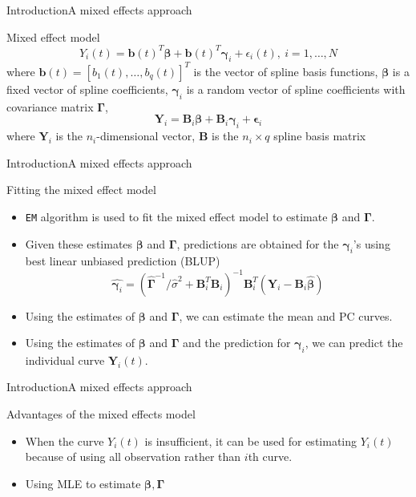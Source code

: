 \documentclass{beamer}
\def \bY {\mathbf{Y}}
\def \bB {\mathbf{B}}
\def \bbeta {\boldsymbol{\beta}}
\def \bepsilon {\boldsymbol{\epsilon}}
\def \bgamma {\boldsymbol{\gamma}}
\def \bGamma {\boldsymbol{\Gamma}}
\begin{document}
\begin{frame}{Introduction}{A mixed effects approach}
	\begin{block}{Mixed effect model}
		$$ Y_i(t)=\mathbf{b}(t)^T\bbeta + \mathbf{b}(t)^T\bgamma_i+\epsilon_i(t), \ i=1,\dots,N $$
		where $\mathbf{b}(t)=[b_1(t),\dots,b_q(t)]^T $ is the vector of spline basis functions,
		$\bbeta$ is a fixed vector of spline coefficients, 
		$\bgamma_i$ is a random vector of spline coefficients with covariance matrix $\bGamma$, 
		$$ \bY_i=\bB_i\bbeta + \bB_i\bgamma_i + \bepsilon_i $$
		where $\bY_i$ is the $n_i$-dimensional vector, $\bB$ is the $n_i \times q$ spline basis matrix
	\end{block}
\end{frame}

\begin{frame}{Introduction}{A mixed effects approach}
	\begin{block}{Fitting the mixed effect model}
		\begin{itemize}
			\item {
				\texttt{EM} algorithm is used to fit the mixed effect model to estimate $\bbeta$ and $\bGamma$.
			}
			\item {
				Given these estimates $\bbeta$ and $\bGamma$, predictions are obtained  for the $\bgamma_i$'s using best linear unbiased prediction (BLUP)
				$$ \hat{\bgamma_i}= (\hat{\bGamma}^{-1}/\hat{\sigma}^2+\bB_i^T\bB_i)^{-1}\bB_i^T(\bY_i-\bB_i\hat{\bbeta}) $$
			}
			\item {
				Using the estimates of $\bbeta$ and $\bGamma$, we can estimate the mean and PC curves.
			}
			\item {
				Using the estimates of $\bbeta$ and $\bGamma$ and the prediction for $\bgamma_i$, we can predict the individual curve $\bY_i(t)$.
			}
		\end{itemize}
	\end{block}
	
\end{frame}

\begin{frame}{Introduction}{A mixed effects approach}
	\begin{block}{Advantages of the mixed effects model}
		\begin{itemize}
			\item {
				When the curve $Y_i(t)$ is insufficient, it can be used for estimating $Y_i(t)$ because of using all observation rather than $i$th curve.
			}
			\item {
				Using MLE to estimate $\bbeta, \bGamma$
			}
		\end{itemize}
	\end{block}
\end{frame}
\end{document}
